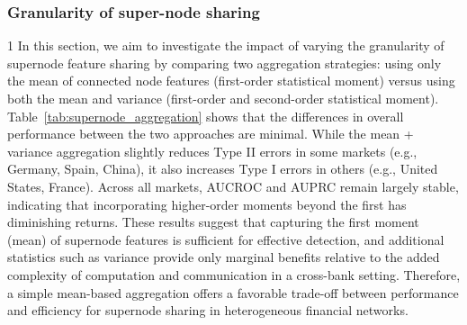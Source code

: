 \documentclass[11pt,english]{article}
\begin{document}
\subsubsection{Granularity of super-node sharing}
\label{supernode_high_order_results}1
In this section, we aim to investigate the impact of varying the granularity of supernode feature sharing by comparing two aggregation strategies: using only the mean of connected node features (first-order statistical moment) versus using both the mean and variance (first-order and second-order statistical moment). Table~\ref{tab:supernode_aggregation} shows that the differences in overall performance between the two approaches are minimal. While the mean + variance aggregation slightly reduces Type II errors in some markets (e.g., Germany, Spain, China), it also increases Type I errors in others (e.g., United States, France). Across all markets, AUCROC and AUPRC remain largely stable, indicating that incorporating higher-order moments beyond the first has diminishing returns. These results suggest that capturing the first moment (mean) of supernode features is sufficient for effective detection, and additional statistics such as variance provide only marginal benefits relative to the added complexity of computation and communication in a cross-bank setting. Therefore, a simple mean-based aggregation offers a favorable trade-off between performance and efficiency for supernode sharing in heterogeneous financial networks.
\end{document}
